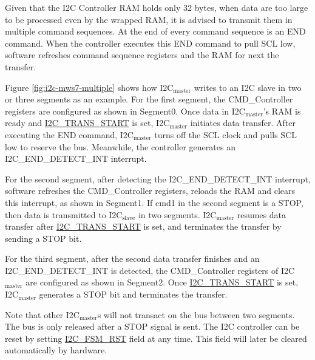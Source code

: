 \documentclass[main\_\_EN.tex]{subfiles}
\begin{document}
Given that the I2C Controller RAM holds only 32 bytes, when data are too large to be processed even by the wrapped RAM, it is advised to transmit them in multiple command sequences. At the end of every command sequence is an END command. When the controller executes this END command to pull SCL low, software refreshes command sequence registers and the RAM for next the transfer.

Figure \ref{fig:i2c-mws7-multiple} shows how I2C$_\text{master}$ writes to an I2C slave in two or three segments as an example. For the first segment, the CMD\_Controller registers are configured as shown in Segment0. Once data in I2C$_\text{master}$'s RAM is ready and \hyperref[fielddesc:I2CTRANSSTART]{I2C\_TRANS\_START} is set, I2C$_\text{master}$ initiates data transfer. After executing the END command, I2C$_\text{master}$ turns off the SCL clock and pulls SCL low to reserve the bus. Meanwhile, the controller generates an I2C\_END\_DETECT\_INT interrupt.

For the second segment, after detecting the I2C\_END\_DETECT\_INT interrupt, software refreshes the CMD\_Controller registers, reloads the RAM and clears this interrupt, as shown in Segment1. If cmd1 in the second segment is a STOP, then data is transmitted to I2C$_\text{slave}$ in two segments. I2C$_\text{master}$ resumes data transfer after \hyperref[fielddesc:I2CTRANSSTART]{I2C\_TRANS\_START} is set, and terminates the transfer by sending a STOP bit.

For the third segment, after the second data transfer finishes and an I2C\_END\_DETECT\_INT is detected, the CMD\_Controller registers of I2C$_\text{master}$ are configured as shown in Segment2. Once \hyperref[fielddesc:I2CTRANSSTART]{I2C\_TRANS\_START} is set, I2C$_\text{master}$ generates a STOP bit and terminates the transfer.

Note that other I2C$_\text{master}$s will not transact on the bus between two segments. The bus is only released after a STOP signal is sent. The I2C controller can be reset by setting \hyperref[fielddesc:I2CFSMRST]{I2C\_FSM\_RST} field at any time. This field will later be cleared automatically by hardware.
\end{document}
